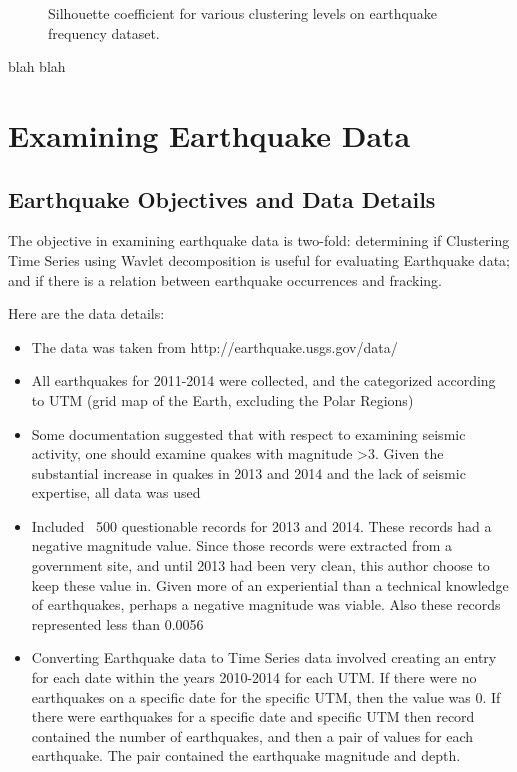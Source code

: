\documentclass{article}
\begin{document}
\begin{figure}
\begin{center}
\caption{Silhouette coefficient for various clustering levels on earthquake frequency dataset.} \label{silhouette_score_eq}
\end{center}
\end{figure}


blah blah

\section{Examining Earthquake Data}
\subsection{Earthquake Objectives and Data Details}

The objective in examining earthquake data is two-fold: determining if Clustering Time Series using Wavlet decomposition is useful for evaluating Earthquake data; and if there is a relation between earthquake occurrences and fracking.

Here are the data details:
\begin{itemize}
\item The data was taken from http://earthquake.usgs.gov/data/
\item All earthquakes for 2011-2014 were collected, and the categorized according to UTM (grid map of the Earth, excluding the Polar Regions)
\item Some documentation suggested that with respect to examining seismic activity, one should examine quakes with magnitude >3.  Given the substantial increase in quakes in 2013 and 2014 and the lack of seismic expertise, all data was used
\item Included ~500 questionable records for 2013 and 2014. These records had a negative magnitude value. Since those records were extracted from a government site, and until 2013 had been very clean, this author choose to keep these value in.  Given more of an experiential than a technical knowledge of earthquakes, perhaps a negative magnitude was viable.  Also these records represented less than 0.0056%
\item  Converting Earthquake data to Time Series data involved creating an entry for each date within the years 2010-2014 for each UTM.  If there were no earthquakes on a specific date for the specific UTM, then the value was 0. If there were earthquakes for a specific date and specific UTM then record contained the number of earthquakes, and then a pair of values for each earthquake.  The pair contained the earthquake magnitude and depth.

\end{itemize}
\end{document}
